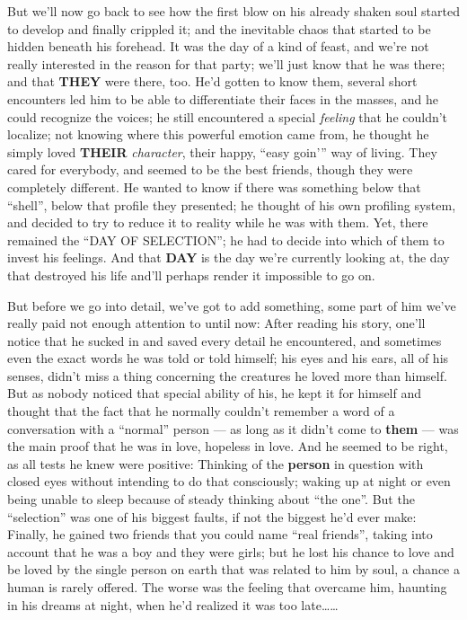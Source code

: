But we'll now go back to see how the first blow on his already shaken soul started to develop and finally crippled it; and the inevitable chaos that started to be hidden beneath his forehead. 
It was the day of a kind of feast, and we're not really interested in the reason for that party; we'll just know that he was there; and that \textbf{THEY} were there, too. He'd gotten to know them, several short encounters led him to be able to differentiate their faces in the masses, and he could recognize the voices; he still encountered a special \emph{feeling} that he couldn't localize; not knowing where this powerful emotion came from, he thought he simply loved \textbf{THEIR} \emph{character}, their happy, \enquote{easy goin'} way of living. They cared for everybody, and seemed to be the best friends, though they were completely different. He wanted to know if there was something below that \enquote{shell}, below that profile they presented; he thought of his own profiling system, and decided to try to reduce it to reality while he was with them. Yet, there remained the \enquote{DAY OF SELECTION}; he had to decide into which of them to invest his feelings. And that \textbf{DAY} is the day we're currently looking at, the day that destroyed his life and'll perhaps render it impossible to go on.

But before we go into detail, we've got to add something, some part of him we've really paid not enough attention to until now: After reading his story, one'll notice that he sucked in and saved every detail he encountered, and sometimes even the exact words he was told or told himself; his eyes and his ears, all of his senses, didn't miss a thing concerning the creatures he loved more than himself. But as nobody noticed that special ability of his, he kept it for himself and thought that the fact that he normally couldn't remember a word of a conversation with a \enquote{normal} person --- as long as it didn't come to \textbf{them} --- was the main proof that he was in love, hopeless in love. And he seemed to be right, as all tests he knew were positive: Thinking of the \textbf{person} in question with closed eyes without intending to do that consciously; waking up at night or even being unable to sleep because of steady thinking about \enquote{the one}. But the \enquote{selection} was one of his biggest faults, if not the biggest he'd ever make: Finally, he gained two friends that you could name \enquote{real friends}, taking into account that he was a boy and they were girls; but he lost his chance to love and be loved by the single person on earth that was related to him by soul, a chance a human is rarely offered. The worse was the feeling that overcame him, haunting in his dreams at night, when he'd realized it was too late\ldots\ldots

